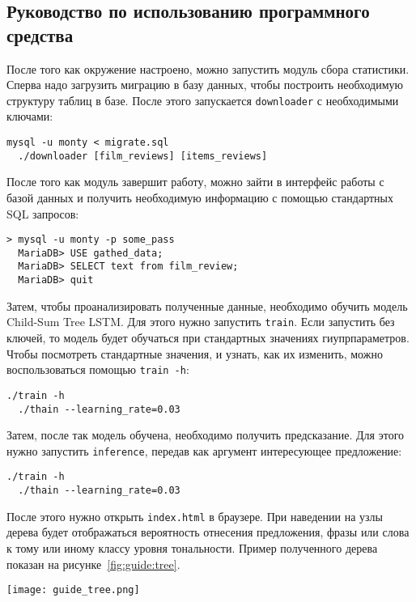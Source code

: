 \subsection{Руководство по использованию программного средства}
После того как окружение настроено, можно запустить модуль сбора статистики. Сперва надо загрузить миграцию в базу данных, чтобы построить необходимую структуру таблиц в базе. После этого запускается \texttt{downlo\-ader} с необходимыми ключами:
\medskip
\begin{lstlisting}[style=Python]
  mysql -u monty < migrate.sql
  ./downloader [film_reviews] [items_reviews]
\end{lstlisting}
\medskip

После того как модуль завершит работу, можно зайти в интерфейс работы с базой данных и получить необходимую информацию с помощью стандартных SQL запросов:
\medskip
\begin{lstlisting}[style=Python]
  > mysql -u monty -p some_pass
  MariaDB> USE gathed_data;
  MariaDB> SELECT text from film_review;
  MariaDB> quit
\end{lstlisting}
\medskip

Затем, чтобы проанализировать полученные данные, необходимо обучить модель Child-Sum Tree LSTM\@. Для этого нужно запустить \texttt{train}. Если запустить без ключей, то модель будет обучаться при стандартных значениях гиупрпараметров. Чтобы посмотреть стандартные значения, и узнать, как их изменить, можно воспользоваться помощью \texttt{train -h}:
\medskip
\begin{lstlisting}[style=Python]
  ./train -h
  ./thain --learning_rate=0.03
\end{lstlisting}
\medskip

Затем, после так модель обучена, необходимо получить предсказание. Для этого нужно запустить \texttt{inference}, передав как аргумент интересующее предложение:
\medskip
\begin{lstlisting}[style=Python]
  ./train -h
  ./thain --learning_rate=0.03
\end{lstlisting}
\medskip

После этого нужно открыть \texttt{index.html} в браузере. При наведении на узлы дерева будет отображаться вероятность отнесения предложения, фразы или слова к тому или иному классу уровня тональности. Пример полученного дерева показан на рисунке~\ref{fig:guide:tree}.

\begin{center}
  \texttt{[image: guide\_tree.png]}
  \label{fig:guide:tree}
\end{center}
